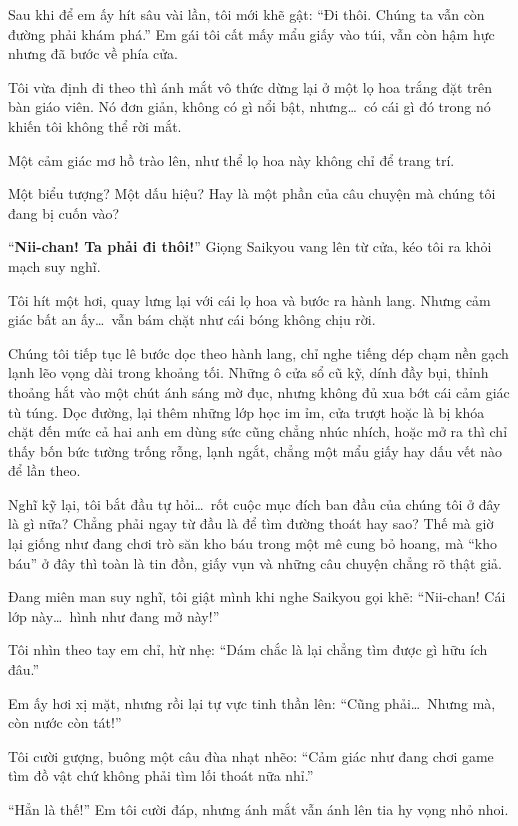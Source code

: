 \documentclass[../main.tex]{subfiles}
\begin{document}
Sau khi để em ấy hít sâu vài lần, tôi mới khẽ gật: ``Đi thôi. Chúng ta vẫn còn đường phải khám phá.'' Em gái tôi cất mấy mẩu giấy vào túi, vẫn còn hậm hực nhưng đã bước về phía cửa.

Tôi vừa định đi theo thì ánh mắt vô thức dừng lại ở một lọ hoa trắng đặt trên bàn giáo viên.
Nó đơn giản, không có gì nổi bật, nhưng\dots\ có cái gì đó trong nó khiến tôi không thể rời mắt.

Một cảm giác mơ hồ trào lên, như thể lọ hoa này không chỉ để trang trí.

Một biểu tượng? Một dấu hiệu? Hay là một phần của câu chuyện mà chúng tôi đang bị cuốn vào?

``\textbf{Nii-chan! Ta phải đi thôi!}'' Giọng Saikyou vang lên từ cửa, kéo tôi ra khỏi mạch suy nghĩ.

Tôi hít một hơi, quay lưng lại với cái lọ hoa và bước ra hành lang. Nhưng cảm giác bất an ấy\dots\ vẫn bám chặt như cái bóng không chịu rời.

\ct

Chúng tôi tiếp tục lê bước dọc theo hành lang, chỉ nghe tiếng dép chạm nền gạch lạnh lẽo vọng dài trong khoảng tối. Những ô cửa sổ cũ kỹ, dính đầy bụi, thỉnh thoảng hắt vào một chút ánh sáng mờ đục, nhưng không đủ xua bớt cái cảm giác tù túng. Dọc đường, lại thêm những lớp học im ỉm, cửa trượt hoặc là bị khóa chặt đến mức cả hai anh em dùng sức cũng chẳng nhúc nhích, hoặc mở ra thì chỉ thấy bốn bức tường trống rỗng, lạnh ngắt, chẳng một mẩu giấy hay dấu vết nào để lần theo.

Nghĩ kỹ lại, tôi bắt đầu tự hỏi\dots\ rốt cuộc mục đích ban đầu của chúng tôi ở đây là gì nữa? Chẳng phải ngay từ đầu là để tìm đường thoát hay sao? Thế mà giờ lại giống như đang chơi trò săn kho báu trong một mê cung bỏ hoang, mà ``kho báu'' ở đây thì toàn là tin đồn, giấy vụn và những câu chuyện chẳng rõ thật giả.

Đang miên man suy nghĩ, tôi giật mình khi nghe Saikyou gọi khẽ: ``Nii-chan! Cái lớp này\dots\ hình như đang mở này!''

Tôi nhìn theo tay em chỉ, hừ nhẹ: ``Dám chắc là lại chẳng tìm được gì hữu ích đâu.''

Em ấy hơi xị mặt, nhưng rồi lại tự vực tinh thần lên: ``Cũng phải\dots\ Nhưng mà, còn nước còn tát!''

Tôi cười gượng, buông một câu đùa nhạt nhẽo: ``Cảm giác như đang chơi game tìm đồ vật chứ không phải tìm lối thoát nữa nhỉ.''

``Hẳn là thế!'' Em tôi cười đáp, nhưng ánh mắt vẫn ánh lên tia hy vọng nhỏ nhoi.
\end{document}
